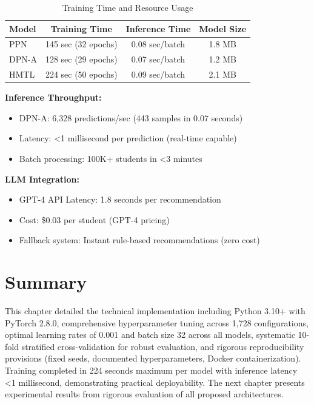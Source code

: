 \begin{table}[h]
\centering
\caption{Training Time and Resource Usage}
\label{tab:compute_perf}
\begin{tabular}{lccc}
\toprule
\textbf{Model} & \textbf{Training Time} & \textbf{Inference Time} & \textbf{Model Size} \\
\midrule
PPN & 145 sec (32 epochs) & 0.08 sec/batch & 1.8 MB \\
DPN-A & 128 sec (29 epochs) & 0.07 sec/batch & 1.2 MB \\
HMTL & 224 sec (50 epochs) & 0.09 sec/batch & 2.1 MB \\
\bottomrule
\end{tabular}
\end{table}

\textbf{Inference Throughput:}
\begin{itemize}
\item DPN-A: 6,328 predictions/sec (443 samples in 0.07 seconds)
\item Latency: <1 millisecond per prediction (real-time capable)
\item Batch processing: 100K+ students in <3 minutes
\end{itemize}

\textbf{LLM Integration:}
\begin{itemize}
\item GPT-4 API Latency: 1.8 seconds per recommendation
\item Cost: \$0.03 per student (GPT-4 pricing)
\item Fallback system: Instant rule-based recommendations (zero cost)
\end{itemize}

\section{Summary}

This chapter detailed the technical implementation including Python 3.10+ with PyTorch 2.8.0, comprehensive hyperparameter tuning across 1,728 configurations, optimal learning rates of 0.001 and batch size 32 across all models, systematic 10-fold stratified cross-validation for robust evaluation, and rigorous reproducibility provisions (fixed seeds, documented hyperparameters, Docker containerization). Training completed in 224 seconds maximum per model with inference latency <1 millisecond, demonstrating practical deployability. The next chapter presents experimental results from rigorous evaluation of all proposed architectures.
